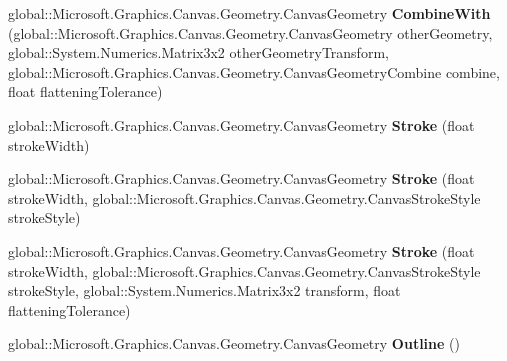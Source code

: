 \begin{DoxyCompactItemize}
\item 
\mbox{\label{class_microsoft_1_1_graphics_1_1_canvas_1_1_geometry_1_1_canvas_geometry_adad804adc3470601bc8179651be8521e}} 
global\+::\+Microsoft.\+Graphics.\+Canvas.\+Geometry.\+Canvas\+Geometry {\bfseries Combine\+With} (global\+::\+Microsoft.\+Graphics.\+Canvas.\+Geometry.\+Canvas\+Geometry other\+Geometry, global\+::\+System.\+Numerics.\+Matrix3x2 other\+Geometry\+Transform, global\+::\+Microsoft.\+Graphics.\+Canvas.\+Geometry.\+Canvas\+Geometry\+Combine combine, float flattening\+Tolerance)
\item 
\mbox{\label{class_microsoft_1_1_graphics_1_1_canvas_1_1_geometry_1_1_canvas_geometry_a8af3ce8304eae3ecf06add5210d5b498}} 
global\+::\+Microsoft.\+Graphics.\+Canvas.\+Geometry.\+Canvas\+Geometry {\bfseries Stroke} (float stroke\+Width)
\item 
\mbox{\label{class_microsoft_1_1_graphics_1_1_canvas_1_1_geometry_1_1_canvas_geometry_aa6cb309b9284fbf870333f012b0bdf86}} 
global\+::\+Microsoft.\+Graphics.\+Canvas.\+Geometry.\+Canvas\+Geometry {\bfseries Stroke} (float stroke\+Width, global\+::\+Microsoft.\+Graphics.\+Canvas.\+Geometry.\+Canvas\+Stroke\+Style stroke\+Style)
\item 
\mbox{\label{class_microsoft_1_1_graphics_1_1_canvas_1_1_geometry_1_1_canvas_geometry_acd5ab184e01cc9bd574ccbe0932c0dfd}} 
global\+::\+Microsoft.\+Graphics.\+Canvas.\+Geometry.\+Canvas\+Geometry {\bfseries Stroke} (float stroke\+Width, global\+::\+Microsoft.\+Graphics.\+Canvas.\+Geometry.\+Canvas\+Stroke\+Style stroke\+Style, global\+::\+System.\+Numerics.\+Matrix3x2 transform, float flattening\+Tolerance)
\item 
\mbox{\label{class_microsoft_1_1_graphics_1_1_canvas_1_1_geometry_1_1_canvas_geometry_a2a21e622cb17f94954463d620c8ba650}} 
global\+::\+Microsoft.\+Graphics.\+Canvas.\+Geometry.\+Canvas\+Geometry {\bfseries Outline} ()
\item 
\mbox{\label{class_microsoft_1_1_graphics_1_1_canvas_1_1_geometry_1_1_canvas_geometry_adcb0f78086d81ae4f562717eb38c2207}} 

\end{DoxyCompactItemize}
